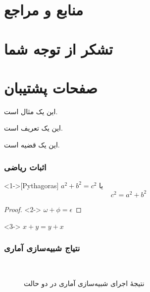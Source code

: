 \documentclass[xcolor=dvipsnames, professionalfonts, aspectratio=169, 11pt]{beamer}
\begin{document}
\section{منابع و مراجع}
\begin{frame}
    \begin{latin}
        \scriptsize
        
    \end{latin}

\end{frame}

\section[تشکر]{تشکر از توجه شما}
\section{صفحات پشتیبان}

\begin{frame}

    \begin{example}
    این یک مثال است.
    \end{example}

    \begin{definition}
    این یک تعریف است.
    \end{definition}

    \begin{theorem}
    این یک قضیه است.
    \end{theorem}
\end{frame}

\begin{frame}
\frametitle{اثبات ریاضی}
\begin{theorem}<1->[Pythagoras]
$ a^2 + b^2 = c^2$
یا
    \[c^2=a^2+b^2\]
\end{theorem}
\begin{proof}<2->
$\omega +\phi = \epsilon $
\end{proof}
\begin{corollary}<3->
$ x + y = y + x  $
\end{corollary}
\end{frame}

\begin{frame}[noframenumbering]
    \frametitle{نتیاج شبیه‌سازی آماری}

    \begin{figure}[htb]
        \centering
        \
        \caption{نتیجهٔ اجرای شبیه‌سازی آماری در دو حالت}
        \label{fig:ode-sais}
    \end{figure}

\end{frame}
\end{document}
